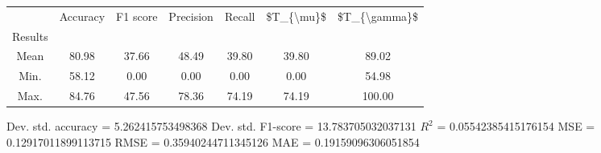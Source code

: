 \begin{tabular}{|c|c|c|c|c|c|c|}
\toprule
{} &  Accuracy &  F1 score &  Precision &  Recall &  \$T\_\{\textbackslash mu\}\$ &  \$T\_\{\textbackslash gamma\}\$ \\
Results &           &           &            &         &            &               \\
\hline
Mean    &     80.98 &     37.66 &      48.49 &   39.80 &      39.80 &         89.02 \\
Min.    &     58.12 &      0.00 &       0.00 &    0.00 &       0.00 &         54.98 \\
Max.    &     84.76 &     47.56 &      78.36 &   74.19 &      74.19 &        100.00 \\
\bottomrule
\end{tabular}

 Dev. std. accuracy = 5.262415753498368
 Dev. std. F1-score = 13.783705032037131
 $R^2$ = 0.05542385415176154
 MSE = 0.12917011899113715
 RMSE = 0.35940244711345126
 MAE = 0.19159096306051854